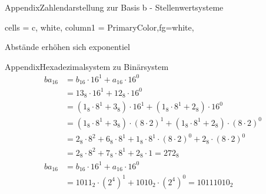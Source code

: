 \begin{frame}[allowframebreaks]{Appendix}{Zahlendarstellung zur Basis b - Stellenwertsysteme\vspace{0.5cm}}
\begin{itemize}
\begin{Sidenote}
\begin{itemize}
\begin{table}
\begin{tblr}{
              cells = {c, white},
              column{1} = {PrimaryColor,fg=white},
            }
          \end{tblr}
          \caption{Abstände erhöhen sich exponentiel}
        \end{table}
      \end{itemize}
      \vspace{-1cm}
    \end{Sidenote}
  \end{itemize}
\end{frame}
\begin{frame}[allowframebreaks]{Appendix}{Hexadezimalsystem zu Binärsystem}
  \begin{align*}
    ba_{16} &= b_{16} \cdot 16^1 + a_{16} \cdot 16^0\\
            &= 13_{8} \cdot 16^1 + 12_{8} \cdot 16^0\\
      &= (1_{8} \cdot 8^1 + 3_{8}) \cdot 16^1 + (1_{8} \cdot 8^1+  2_{8}) \cdot 16^0\\
      &= (1_{8} \cdot 8^1 + 3_{8}) \cdot (8 \cdot 2)^1 + (1_{8} \cdot 8^1+  2_{8}) \cdot (8 \cdot 2)^0\\
      &= 2_{8} \cdot 8^2 + 6_{8} \cdot 8^1 + 1_{8} \cdot 8^1 \cdot (8 \cdot 2)^0 + 2_{8} \cdot (8 \cdot 2)^0\\
      &= 2_{8} \cdot 8^2 + 7_{8} \cdot 8^1 + 2_{8} \cdot 1 = 272_{8} \\
      ba_{16} &= b_{16} \cdot 16^1 + a_{16} \cdot 16^0\\
              &= 1011_{2} \cdot (2^4)^1 + 1010_{2} \cdot (2^4)^0 = 10111010_{2}
  \end{align*}
\end{frame}

